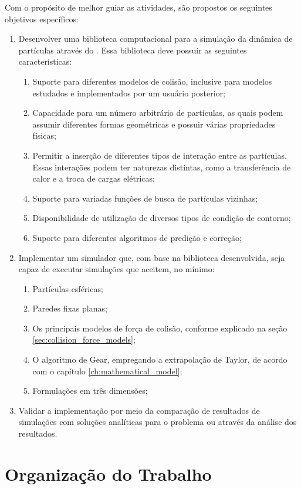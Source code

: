 Com o propósito de melhor guiar as atividades, são propostos os seguintes objetivos específicos:
\begin{enumerate}
\item Desenvolver uma biblioteca computacional para a simulação da dinâmica de partículas através do \DEM{}. Essa biblioteca deve possuir as seguintes características: \label{item:library}
 	\begin{enumerate}
		\item Suporte para diferentes modelos de colisão, inclusive para modelos estudados e implementados por um usuário posterior;
		\item Capacidade para um número arbitrário de partículas, as quais podem assumir diferentes formas geométricas e possuir várias propriedades físicas;
        \item Permitir a inserção de diferentes tipos de interação entre as partículas. Essas interações podem ter naturezas distintas, como a transferência de calor e a troca de cargas elétricas;
		\item Suporte para variadas funções de busca de partículas vizinhas;
		\item Disponibilidade de utilização de diversos tipos de condição de contorno;
		\item Suporte para diferentes algoritmos de predição e correção;
	\end{enumerate}  
\item Implementar um simulador que, com base na biblioteca desenvolvida, seja capaz de executar simulações que aceitem, no mínimo:
	\begin{enumerate}
		\item Partículas esféricas;
		\item Paredes fixas planas;
		\item Os principais modelos de força de colisão, conforme explicado na seção \ref{sec:collision_force_models};
		\item O algoritmo de Gear, empregando a extrapolação de Taylor, de acordo com o capítulo \ref{ch:mathematical_model};
		\item Formulações em três dimensões;
	\end{enumerate}
\item Validar a implementação por meio da comparação de resultados de simulações com soluções analíticas para o problema ou através da análise dos resultados.
\end{enumerate}

\section{Organização do Trabalho}

